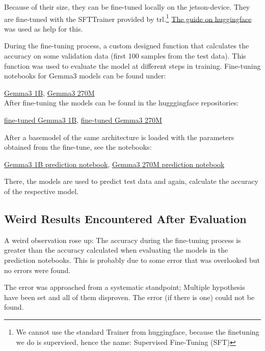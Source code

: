 \documentclass{article}
\begin{document}
Because of their size, they can be fine-tuned locally on the jetson-device.
They are fine-tuned with the SFTTrainer provided by trl.\footnote{We cannot 
use the standard Trainer from huggingface, because the finetuning we do is 
supervised, hence the name: Supervised Fine-Tuning (SFT)} \href{https://huggingface.co/docs/trl/en/sft_trainer}
{The guide on huggingface} was used as help for this.

During the fine-tuning process, a custom designed function that calculates 
the accuracy on some validation data (first 100 samples from the test data). 
This function was used to evaluate the model at different steps in training. 
Fine-tuning notebooks for Gemma3 models can be found under:

\href{https://github.com/AntonStantan/matura/blob/main/pre-trained-tranformers/big_gemma_huggingface.ipynb}{Gemma3 1B}, \href{https://github.com/AntonStantan/matura/blob/main/pre-trained-tranformers/gemma_huggingface.ipynb}{Gemma3 270M}
\\[2em]
After fine-tuning the models can be found in the hugggingface repositories:

\href{https://huggingface.co/AntonBOOM/big_output}{fine-tuned Gemma3 1B}, 
\href{https://huggingface.co/AntonBOOM/output1}{fine-tuned Gemma3 270M}

After a basemodel of the same architecture is loaded with the parameters 
obtained from the fine-tune, see the notebooks: 

\href{https://github.com/AntonStantan/matura/blob/main/pre-trained-tranformers/big_gemma_huggingface_predict.ipynb}{Gemma3 1B prediction notebook}, 
\href{https://github.com/AntonStantan/matura/blob/main/pre-trained-tranformers/gemma-huggingface-predict.ipynb}{Gemma3 270M prediction notebook}

There, the models are used to predict test data and again, calculate the 
accuracy of the respective model.

\subsection{Weird Results Encountered After Evaluation}

A weird observation rose up: The accuracy during the fine-tuning process is 
greater than the accuracy calculated when evaluating the models in the 
prediction notebooks. This is probably due to some error that was overlooked 
but no errors were found.

The error was approached from a systematic standpoint; Multiple hypothesis 
have been set and all of them disproven. The error (if there is one) could 
not be found.
\end{document}
